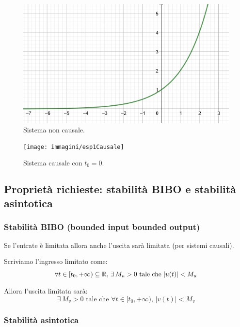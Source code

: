 		
			\begin{figure}[H]
				\centering
				\includegraphics[scale=0.5]{immagini/esp1}
				\caption{ Sistema non causale. }
				\label{fig: esp1}
			\end{figure}
			
			\begin{figure}[H]
				\centering
				\texttt{[image: immagini/esp1Causale]}
				\caption{ Sistema causale con $ t_0 = 0$. }
				\label{fig: esp1Causale}
			\end{figure}
	
	\subsection{Proprietà richieste: stabilità BIBO e stabilità asintotica}

		\subsubsection{Stabilità BIBO (bounded input bounded output)}\label{sist_prop_BIBOstab}
			
			Se l'entrate è limitata allora anche l'uscita sarà limitata (per sistemi causali).
			
			Scriviamo l'ingresso limitato come:
			\[
				\forall t \in [t_0, + \infty) \subseteq \mathbb{R}\text{, } \exists \, M_u >0 \text{ tale che } \lvert u(t) \rvert < M_u	
			\]
			
			Allora l'uscita limitata sarà:
				\[
			\exists \, M_v > 0 \text{ tale che } \forall t \in [t_0, + \infty) \text{, } \lvert v(t) \rvert < M_v
			\]
			
		\subsubsection{Stabilità asintotica}


